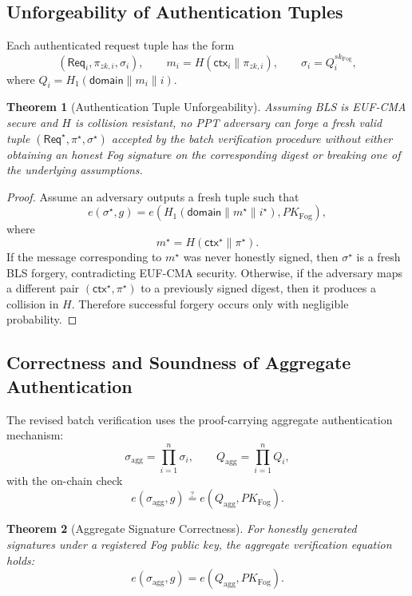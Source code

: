 \documentclass[conference]{IEEEtran}
\newtheorem{theorem}{Theorem}
\begin{document}
\subsection{Unforgeability of Authentication Tuples}

Each authenticated request tuple has the form
\[
(\mathsf{Req}_i,\pi_{zk,i},\sigma_i),
\qquad
m_i=H(\mathsf{ctx}_i\|\pi_{zk,i}),
\qquad
\sigma_i=Q_i^{sk_{\mathrm{Fog}}},
\]
where $Q_i=H_1(\mathsf{domain}\|m_i\|i)$.

\begin{theorem}[Authentication Tuple Unforgeability]
Assuming BLS is EUF-CMA secure and $H$ is collision resistant, no PPT adversary can forge a fresh valid tuple $(\mathsf{Req}^\star,\pi^\star,\sigma^\star)$ accepted by the batch verification procedure without either obtaining an honest Fog signature on the corresponding digest or breaking one of the underlying assumptions.
\end{theorem}

\begin{proof}
Assume an adversary outputs a fresh tuple such that
\[
e(\sigma^\star,g)=e(H_1(\mathsf{domain}\|m^\star\|i^\star),PK_{\mathrm{Fog}}),
\]
where
\[
m^\star = H(\mathsf{ctx}^\star\|\pi^\star).
\]
If the message corresponding to $m^\star$ was never honestly signed, then $\sigma^\star$ is a fresh BLS forgery, contradicting EUF-CMA security. Otherwise, if the adversary maps a different pair $(\mathsf{ctx}^\star,\pi^\star)$ to a previously signed digest, then it produces a collision in $H$. Therefore successful forgery occurs only with negligible probability.
\end{proof}

\subsection{Correctness and Soundness of Aggregate Authentication}

The revised batch verification uses the proof-carrying aggregate authentication mechanism:
\[
\sigma_{\mathrm{agg}}=\prod_{i=1}^{n}\sigma_i,
\qquad
Q_{\mathrm{agg}}=\prod_{i=1}^{n}Q_i,
\]
with the on-chain check
\[
e(\sigma_{\mathrm{agg}},g)\stackrel{?}{=}e(Q_{\mathrm{agg}},PK_{\mathrm{Fog}}).
\]

\begin{theorem}[Aggregate Signature Correctness]
For honestly generated signatures under a registered Fog public key, the aggregate verification equation holds:
\[
e(\sigma_{\mathrm{agg}},g)=e(Q_{\mathrm{agg}},PK_{\mathrm{Fog}}).
\]
\end{theorem}
\end{document}
